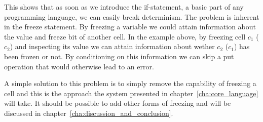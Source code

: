This shows that as soon as we introduce the if-statement, a basic part of any
programming language, we can easily break determinism. The problem is inherent
in the freeze statement. By freezing a variable we could attain information
about the value and freeze bit of another cell. In the example above, by
freezing cell $c_1$ ($c_2$) and inspecting its value we can attain information
about wether $c_2$ ($c_1$) has been frozen or not. By conditioning on this
information we can skip a put operation that would otherwise lead to an error.

A simple solution to this problem is to simply remove the capability of freezing
a cell and this is the approach the system presented in
chapter~\ref{cha:core_language} will take. It should be possible to add other
forms of freezing and will be discussed in
chapter~\ref{cha:discussion_and_conclusion}.



\begin{equation*}
\end{equation*}
